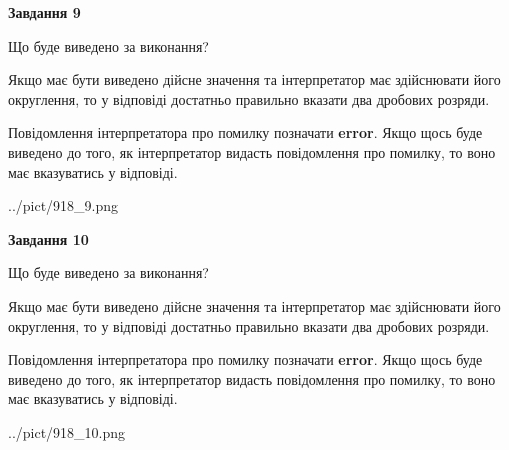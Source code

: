 \documentclass[12pt, ukrainian]{article}
\begin{document}
{\begin {Large}
{\begin {center}\textbf{Завдання 9}\end {center}}\par
Що буде виведено за виконання? \par

Якщо має бути виведено дійсне значення та інтерпретатор має здійснювати його округлення, 
то у відповіді достатньо правильно вказати два дробових розряди.

Повідомлення інтерпретатора про помилку позначати \textbf{error}.
Якщо щось буде виведено до того, як інтерпретатор видасть повідомлення про помилку, 
то воно має вказуватись у відповіді. \par

\begin{center}
	{../pict/918_9.png}
\end{center}
\newpage

{\begin {center}\textbf{Завдання 10}\end {center}}\par
Що буде виведено за виконання? \par

Якщо має бути виведено дійсне значення та інтерпретатор має здійснювати його округлення, 
то у відповіді достатньо правильно вказати два дробових розряди.

Повідомлення інтерпретатора про помилку позначати \textbf{error}.
Якщо щось буде виведено до того, як інтерпретатор видасть повідомлення про помилку, 
то воно має вказуватись у відповіді. \par

\begin{center}
	{../pict/918_10.png}
\end{center}
\newpage

\end {Large}}
\end{document}
